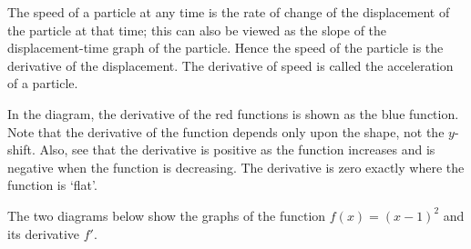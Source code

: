 \begin{ex}
  The speed of a particle at any time is the rate of change of the displacement of the particle at that time;
  this can also be viewed as the slope of the displacement-time graph of the particle. Hence the speed of the
  particle is the derivative of the displacement. The derivative of speed is called the acceleration of a particle.
\end{ex}

\clearpage
\begin{ex}
  In the diagram, the derivative of the red functions is shown as the blue function. Note
  that the derivative of the function depends only upon the shape, not the $ y$-shift. Also,
  see that the derivative is positive as the function increases and is negative when the
  function is decreasing. The derivative is zero exactly where the function is `flat'.

  \begin{center}
  \end{center}
\end{ex}

\begin{ex}
  The two diagrams below show the graphs of the function $ f(x) = (x - 1)^2 $ and its derivative $ f' $.

  \begin{multicols}{2}
  \begin{center}
  \end{center}

  \begin{center}
  \end{center}
  \end{multicols}
\end{ex}

